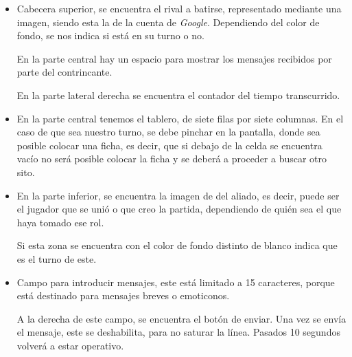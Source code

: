 \begin{itemize}
	\item Cabecera superior, se encuentra el rival a batirse, representado mediante una imagen, siendo esta la de la cuenta de \emph{Google}. Dependiendo del color de fondo, se nos indica si está en su turno o no.
	
	En la parte central hay un espacio para mostrar los mensajes recibidos por parte del contrincante.
	
	En la parte lateral derecha se encuentra el contador del tiempo transcurrido.
	 
	\item En la parte central tenemos el tablero, de siete filas por siete columnas. En el caso de que sea nuestro turno, se debe pinchar en la pantalla, donde sea posible colocar una ficha, es decir, que si debajo de la celda se encuentra vacío no será posible colocar la ficha y se deberá a proceder a buscar otro sito.
	
	\item En la parte inferior, se encuentra la imagen de del aliado, es decir, puede ser el jugador que se unió o que creo la partida, dependiendo de quién sea el que haya tomado ese rol.
	
	Si esta zona se encuentra con el color de fondo distinto de blanco indica que es el turno de este.
	
	\item Campo para introducir mensajes, este está limitado a 15 caracteres, porque está destinado para mensajes breves o emoticonos.
	
	A la derecha de este campo, se encuentra el botón de enviar. Una vez se envía el mensaje, este se deshabilita, para no saturar la línea. Pasados 10 segundos volverá a estar operativo.
\end{itemize}